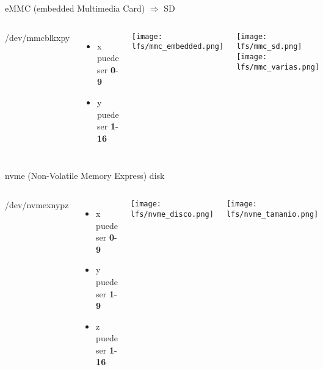 \begin{frame}[c]{eMMC (embedded Multimedia Card) $\Rightarrow$ SD}

  \begin{columns}
      {\huge /dev/mmcblk{\color{red}x}p{\color{blue}y}}
      \begin{itemize}
        \item {\color{red}x} puede ser \textbf{0}-\textbf{9}
        \item {\color{blue}y} puede ser \textbf{1}-\textbf{16}
      \end{itemize}
      \begin{center}
        \texttt{[image: lfs/mmc\_embedded.png]}
      \end{center}
      \begin{center}
        \texttt{[image: lfs/mmc\_sd.png]}
        \texttt{[image: lfs/mmc\_varias.png]}
      \end{center}
  \end{columns}
\end{frame}

\begin{frame}[c]{nvme (Non-Volatile Memory Express) disk}

  \begin{columns}
      {\huge /dev/nvme{\color{red}x}n{\color{blue}y}p{\color{magenta}z}}
      \begin{itemize}
        \item {\color{red}x} puede ser \textbf{0}-\textbf{9}
        \item {\color{blue}y} puede ser \textbf{1}-\textbf{9}
        \item {\color{magenta}z} puede ser \textbf{1}-\textbf{16}
      \end{itemize}
      \begin{center}
        \texttt{[image: lfs/nvme\_disco.png]}
      \end{center}
      \begin{center}
        \texttt{[image: lfs/nvme\_tamanio.png]}
      \end{center}
  \end{columns}
\end{frame}

